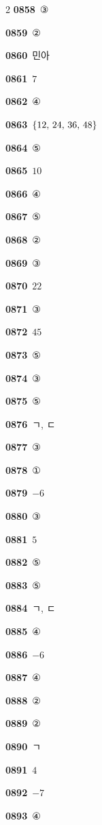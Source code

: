 \documentclass[10pt,a4paper]{article}
\begin{document}
\begin{multicols}{2}
\noindent\textbf{0858}\ ③\par
\noindent\textbf{0859}\ ②\par
\noindent\textbf{0860}\ 민아\par
\noindent\textbf{0861}\ $7$\par
\noindent\textbf{0862}\ ④\par
\noindent\textbf{0863}\ $\{12,\mkern3mu 24,\mkern3mu 36,\mkern3mu 48\}$\par
\noindent\textbf{0864}\ ⑤\par
\noindent\textbf{0865}\ $10$\par
\noindent\textbf{0866}\ ④\par
\noindent\textbf{0867}\ ⑤\par
\noindent\textbf{0868}\ ②\par
\noindent\textbf{0869}\ ③\par
\noindent\textbf{0870}\ $22$\par
\noindent\textbf{0871}\ ③\par
\noindent\textbf{0872}\ $45$\par
\noindent\textbf{0873}\ ⑤\par
\noindent\textbf{0874}\ ③\par
\noindent\textbf{0875}\ ⑤\par
\noindent\textbf{0876}\ ㄱ, ㄷ\par
\noindent\textbf{0877}\ ③\par
\noindent\textbf{0878}\ ①\par
\noindent\textbf{0879}\ $-6$\par
\noindent\textbf{0880}\ ③\par
\noindent\textbf{0881}\ $5$\par
\noindent\textbf{0882}\ ⑤\par
\noindent\textbf{0883}\ ⑤\par
\noindent\textbf{0884}\ ㄱ, ㄷ\par
\noindent\textbf{0885}\ ④\par
\noindent\textbf{0886}\ $-6$\par
\noindent\textbf{0887}\ ④\par
\noindent\textbf{0888}\ ②\par
\noindent\textbf{0889}\ ②\par
\noindent\textbf{0890}\ ㄱ\par
\noindent\textbf{0891}\ $4$\par
\noindent\textbf{0892}\ $-7$\par
\noindent\textbf{0893}\ ④\par

\end{multicols}
\end{document}

